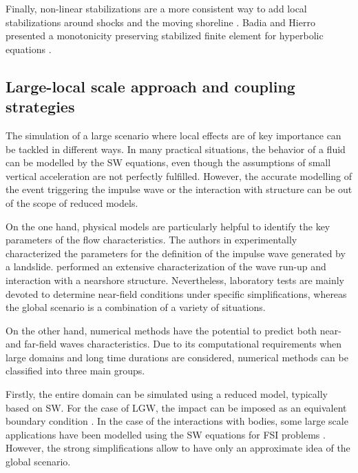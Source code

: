 Finally, non-linear stabilizations are a more consistent way to add local stabilizations around shocks and the moving shoreline \cite{codina2011}. Badia and Hierro presented a monotonicity preserving stabilized finite element for hyperbolic equations \cite{badia2014}.



\subsection{Large-local scale approach and coupling strategies}


The simulation of a large scenario where local effects are of key importance can be tackled in different ways. In many practical situations, the behavior of a fluid can be modelled by the SW equations, even though the assumptions of small vertical acceleration are not perfectly fulfilled. However, the accurate modelling of the event triggering the impulse wave or the interaction with structure can be out of the scope of reduced models.

On the one hand, physical models are particularly helpful to identify the key parameters of the flow characteristics. The authors in \cite{noda1970water, fritz2004near, mulligan2017} experimentally characterized the parameters for the definition of the impulse wave generated by a landslide. \cite{krautwald2020,krautwald2022} performed an extensive characterization of the wave run-up and interaction with a nearshore structure. Nevertheless, laboratory tests are mainly devoted to determine near-field conditions under specific simplifications, whereas the global scenario is a combination of a variety of situations.

On the other hand, numerical methods have the potential to predict both near- and far-field waves characteristics. Due to its computational requirements when large domains and long time durations are considered, numerical methods can be classified into three main groups.

Firstly, the entire domain can be simulated using a reduced model, typically based on SW. For the case of LGW, the impact can be imposed as an equivalent boundary condition \cite{waythomas2003numerical, ataie2008mapping}. In the case of the interactions with bodies, some large scale applications have been modelled using the SW equations for FSI problems \cite{geveler2010,bresch2021}. However, the strong simplifications allow to have only an approximate idea of the global scenario.

